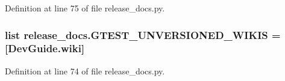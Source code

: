 Definition at line 75 of file release\+\_\+docs.\+py.

\subsubsection[{\texorpdfstring{G\+T\+E\+S\+T\+\_\+\+U\+N\+V\+E\+R\+S\+I\+O\+N\+E\+D\+\_\+\+W\+I\+K\+IS}{GTEST_UNVERSIONED_WIKIS}}]{\setlength{\rightskip}{0pt plus 5cm}list release\+\_\+docs.\+G\+T\+E\+S\+T\+\_\+\+U\+N\+V\+E\+R\+S\+I\+O\+N\+E\+D\+\_\+\+W\+I\+K\+IS = \mbox{[}\textquotesingle{}Dev\+Guide.\+wiki\textquotesingle{}\mbox{]}}\hypertarget{namespacerelease__docs_aaeabb8c74d9db7a4b2f3c66e8f1a04ee}{}\label{namespacerelease__docs_aaeabb8c74d9db7a4b2f3c66e8f1a04ee}


Definition at line 74 of file release\+\_\+docs.\+py.

